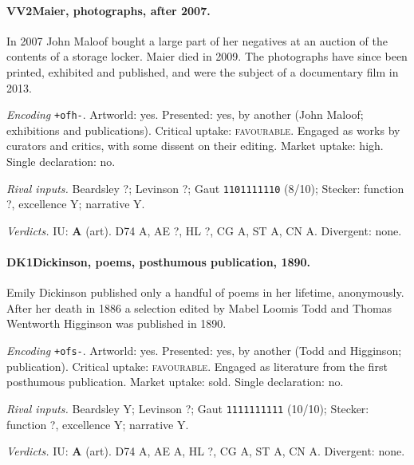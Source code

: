 \paragraph{VV2\enspace Maier, photographs, after 2007.}
In 2007 John Maloof bought a large part of her negatives at an auction of the contents of a storage locker. Maier died in 2009. The photographs have since been printed, exhibited and published, and were the subject of a documentary film in 2013.\par
\noindent\textit{Encoding} \texttt{+ofh-}. Artworld: yes. Presented: yes, by another (John Maloof; exhibitions and publications). Critical uptake: \textsc{favourable}. Engaged as works by curators and critics, with some dissent on their editing. Market uptake: high. Single declaration: no.\par
\noindent\textit{Rival inputs.} Beardsley ?; Levinson ?; Gaut \texttt{1101111110} (8/10); Stecker: function ?, excellence Y; narrative Y.\par
\noindent\textit{Verdicts.} IU: \textbf{A} (art). D74 A, AE ?, HL ?, CG A, ST A, CN A. Divergent: none.\par

\paragraph{DK1\enspace Dickinson, poems, posthumous publication, 1890.}
Emily Dickinson published only a handful of poems in her lifetime, anonymously. After her death in 1886 a selection edited by Mabel Loomis Todd and Thomas Wentworth Higginson was published in 1890.\par
\noindent\textit{Encoding} \texttt{+ofs-}. Artworld: yes. Presented: yes, by another (Todd and Higginson; publication). Critical uptake: \textsc{favourable}. Engaged as literature from the first posthumous publication. Market uptake: sold. Single declaration: no.\par
\noindent\textit{Rival inputs.} Beardsley Y; Levinson ?; Gaut \texttt{1111111111} (10/10); Stecker: function ?, excellence Y; narrative Y.\par
\noindent\textit{Verdicts.} IU: \textbf{A} (art). D74 A, AE A, HL ?, CG A, ST A, CN A. Divergent: none.\par

